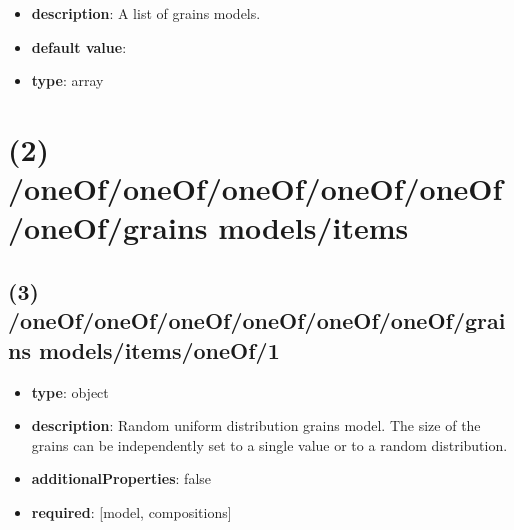 \begin{itemize}[leftmargin=1em]\item {\bf description}: A list of grains models.
\item {\bf default value}: 
\item {\bf type}: array
\end{itemize}\section{(2) /oneOf/oneOf/oneOf/oneOf/oneOf/oneOf/grains models/items}

\subsection{(3) /oneOf/oneOf/oneOf/oneOf/oneOf/oneOf/grains models/items/oneOf/1}
\begin{itemize}[leftmargin=3em]\item {\bf type}: object
\item {\bf description}: Random uniform distribution grains model. The size of the grains can be independently set to a single value or to a random distribution.
\item {\bf additionalProperties}: false
\item {\bf required}: [model, compositions]\end{itemize}
